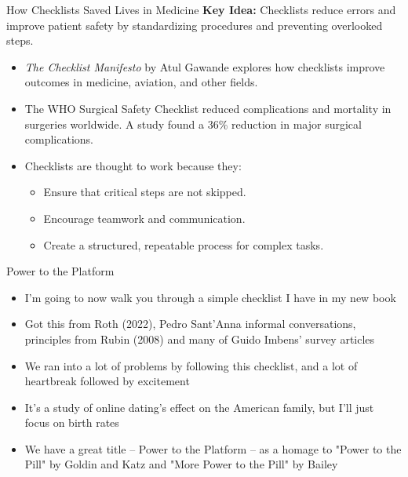 \documentclass{beamer}
\begin{document}
\begin{frame}{How Checklists Saved Lives in Medicine}
    \textbf{Key Idea:} Checklists reduce errors and improve patient safety by standardizing procedures and preventing overlooked steps.

    \begin{itemize}
        \item 
	\textit{The Checklist Manifesto} by Atul Gawande explores how checklists improve outcomes in medicine, aviation, and other fields.
        \item 
	The WHO Surgical Safety Checklist reduced complications and mortality in surgeries worldwide. A study found a 36\% reduction in major surgical complications.
        \item 
	Checklists are thought to work because they:
        \begin{itemize}
            \item Ensure that critical steps are not skipped.
            \item Encourage teamwork and communication.
            \item Create a structured, repeatable process for complex tasks.
        \end{itemize}
    \end{itemize}


\end{frame}


\begin{frame}{Power to the Platform}

\begin{itemize}
\item I'm going to now walk you through a simple checklist I have in my new book
\item Got this from Roth (2022), Pedro Sant'Anna informal conversations, principles from Rubin (2008) and many of Guido Imbens' survey articles
\item We ran into a lot of problems by following this checklist, and a lot of heartbreak followed by excitement
\item It's a study of online dating's effect on the American family, but I'll just focus on birth rates
\item We have a great title -- Power to the Platform -- as a homage to "Power to the Pill" by Goldin and Katz and "More Power to the Pill" by Bailey
\end{itemize}

\end{frame}
\end{document}
